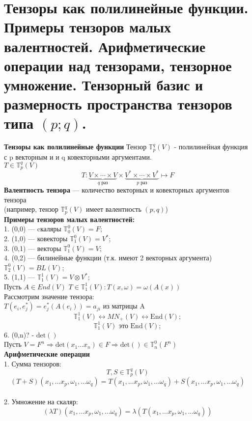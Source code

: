 \documentclass[12pt]{article}
\begin{document}
\section{Тензоры как полилинейные функции. Примеры тензоров малых валентностей. Арифметические операции над тензорами, тензорное умножение. Тензорный базис и размерность пространства тензоров типа $(p; q)$.}
\textbf{Тензоры как полилинейные функции}
Тензор \(\mathbb{T}^q_p(V)\) - полилинейная функция с p векторным и и q ковекторными аргументами.\\
\(T \in \mathbb{T}^q_p(V)\)\\
\[
T:\underbrace{V \times \cdots \times V}_{q \text{ раз}} \times \underbrace{V^* \times \cdots \times V^*}_{p \text{ раз}}\mapsto F
\]
\textbf{Валентность тензора} --- количество векторных и ковекторных аргументов тензора\\
(например, тензор \(\mathbb{T}^q_p(V)\) имеет валентность $(p,q)$)\\
\textbf{Примеры тензоров малых валентностей:}\\
1. (0,0) --- cкаляры \(\mathbb{T}^0_0(V)=F\);\\
2. (1,0) --- ковекторы \(\mathbb{T}^0_1(V)=V^*\);\\
3. (0,1) --- векторы \(\mathbb{T}^0_1(V)=V\);\\
4. (0,2) --- билинейные функции (т.к. имеют 2 векторных аргумента) \(\mathbb{T}^0_2(V)=BL(V)\);\\
5. (1,1) --- \(\mathbb{T}^1_1(V)=V\otimes V^*\);\\
Пусть \(A \in End(V)\) \(T \in \mathbb{T}^1_1(V):T(x,\omega)=\omega(A(x))\)\\
Рассмотрим значение тензора:\\
\(T(e_i,e_j^*)=e_j^*(A(e_i))=a_{ji}\) из матрицы A\\
\[
\mathbb{T}^1_1(V)\leftrightarrow {MN}_+(V)\leftrightarrow \mathrm{End}(V);
\]\[
\mathbb{T}^1_1(V)\textbf{ это } \mathrm{End}(V);
\]
6. (0,n)? - \( \mathrm{det}()\)\\
Пусть \( V=F^n \Rightarrow \mathrm{det}(x_1 ... x_n)\in F \Rightarrow \mathrm{det}() \in \mathbb{T}^0_n(F^n)\)\\
\textbf{Арифметические операции}\\
1. Сумма тензоров:\\
\[
T,S \in  \mathbb{T}^q_p(V)
\]
\[(T+S)(x_1,...x_p,\omega_1,...\omega_q)=T(x_1,...x_p,\omega_1,...\omega_q)+S(x_1,...x_p,\omega_1,...\omega_q)\]\\
2. Умножение на скаляр:
\[(\lambda T)(x_1,...x_p,\omega_1,...\omega_q)=\lambda (T(x_1,...x_p,\omega_1,...\omega_q))\]\\
\end{document}
